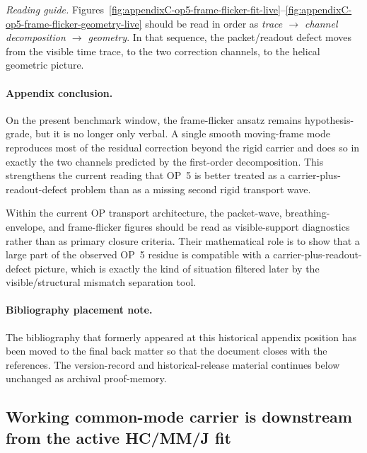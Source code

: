 \noindent\textit{Reading guide.} Figures~\ref{fig:appendixC-op5-frame-flicker-fit-live}--\ref{fig:appendixC-op5-frame-flicker-geometry-live} should be read in order as \emph{trace $\rightarrow$ channel decomposition $\rightarrow$ geometry}. In that sequence, the packet/readout defect moves from the visible time trace, to the two correction channels, to the helical geometric picture.

\paragraph{Appendix conclusion.}
On the present benchmark window, the frame-flicker ansatz remains hypothesis-grade, but it is no longer only verbal. A single smooth moving-frame mode reproduces most of the residual correction beyond the rigid carrier and does so in exactly the two channels predicted by the first-order decomposition. This strengthens the current reading that OP~5 is better treated as a carrier-plus-readout-defect problem than as a missing second rigid transport wave.

\begin{remark}
Within the current OP transport architecture, the packet-wave, breathing-envelope, and frame-flicker figures should be read as visible-support diagnostics rather than as primary closure criteria. Their mathematical role is to show that a large part of the observed OP~5 residue is compatible with a carrier-plus-readout-defect picture, which is exactly the kind of situation filtered later by the visible/structural mismatch separation tool.
\end{remark}

\paragraph{Bibliography placement note.}
The bibliography that formerly appeared at this historical appendix position has been moved to the final back matter so that the document closes with the references. The version-record and historical-release material continues below unchanged as archival proof-memory.






\subsection*{Working common-mode carrier is downstream from the active HC/MM/J fit}

